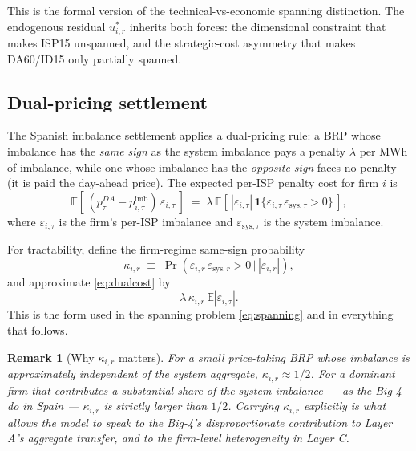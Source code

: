 \documentclass[11pt]{article}
\newtheorem{remark}{Remark}
\begin{document}
This is the formal version of the technical-vs-economic spanning distinction. The endogenous residual $u^{*}_{i,r}$ inherits both forces: the dimensional constraint that makes ISP15 unspanned, and the strategic-cost asymmetry that makes DA60/ID15 only partially spanned.

\subsection{Dual-pricing settlement}
\label{sec:model-dualpricing}

The Spanish imbalance settlement applies a dual-pricing rule: a BRP whose imbalance has the \emph{same sign} as the system imbalance pays a penalty $\lambda$ per MWh of imbalance, while one whose imbalance has the \emph{opposite sign} faces no penalty (it is paid the day-ahead price). The expected per-ISP penalty cost for firm $i$ is
\begin{equation}
\mathbb{E}\!\left[\,(p^{DA}_{\tau} - p^{\text{imb}}_{i,\tau})\,\varepsilon_{i,\tau}\,\right]
\;=\; \lambda\,\mathbb{E}\!\left[\,|\varepsilon_{i,\tau}|\,\mathbf{1}\{\varepsilon_{i,\tau}\,\varepsilon_{\text{sys},\tau} > 0\}\,\right],
\label{eq:dualcost}
\end{equation}
where $\varepsilon_{i,\tau}$ is the firm's per-ISP imbalance and $\varepsilon_{\text{sys},\tau}$ is the system imbalance.

For tractability, define the firm-regime same-sign probability
\begin{equation}
\kappa_{i,r} \;\equiv\; \Pr\!\left(\varepsilon_{i,r}\,\varepsilon_{\text{sys},r} > 0 \,\big|\, |\varepsilon_{i,r}|\right),
\label{eq:kappa}
\end{equation}
and approximate \eqref{eq:dualcost} by
\begin{equation}
\lambda\,\kappa_{i,r}\,\mathbb{E}|\varepsilon_{i,\tau}|.
\label{eq:linearpenalty}
\end{equation}
This is the form used in the spanning problem \eqref{eq:spanning} and in everything that follows.

\begin{remark}[Why $\kappa_{i,r}$ matters]
For a small price-taking BRP whose imbalance is approximately independent of the system aggregate, $\kappa_{i,r} \approx 1/2$. For a dominant firm that contributes a substantial share of the system imbalance --- as the Big-4 do in Spain --- $\kappa_{i,r}$ is strictly larger than $1/2$. Carrying $\kappa_{i,r}$ explicitly is what allows the model to speak to the Big-4's disproportionate contribution to Layer A's aggregate transfer, and to the firm-level heterogeneity in Layer C.
\end{remark}
\end{document}
